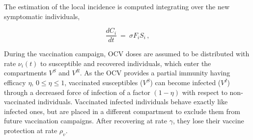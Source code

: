 The estimation of the local incidence is computed integrating over the new symptomatic individuals,

\begin{equation}
\frac{d C_i}{dt} \ = \ \sigma F_i S_i  \, , \label{eq:C}
\end{equation}

During the vaccination campaign, OCV doses are assumed to be distributed with rate $\nu_i(t)$ to susceptible and recovered individuals, which enter the compartments $V^S$ and $V^R$. As the OCV provides a partial immunity having efficacy $\eta$, $0\leq \eta \leq 1$, vaccinated susceptibles ($V^S$) can become infected ($V^I$) through a decreased force of infection of a factor $(1-\eta)$ with respect to non-vaccinated individuals. Vaccinated infected individuals behave exactly like infected ones, but are placed in a different compartment to exclude them from future vaccination campaigns. After recovering at  rate $\gamma$, they lose their vaccine protection at rate $\rho_{v}$.
